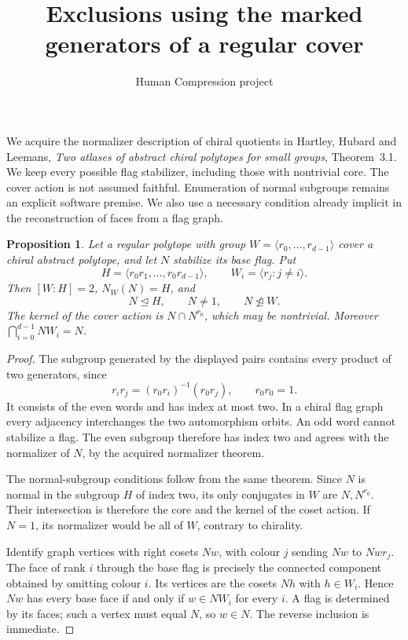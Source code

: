 \documentclass[11pt]{article}
\title{Exclusions using the marked generators of a regular cover}
\author{Human Compression project}\date{}
\newtheorem{proposition}{Proposition}
\begin{document}
\maketitle
We acquire the normalizer description of chiral quotients in Hartley,
Hubard and Leemans, \emph{Two atlases of abstract chiral polytopes for
small groups}, Theorem~3.1. We keep every possible flag stabilizer,
including those with nontrivial core. The cover action is not assumed
faithful. Enumeration of normal subgroups remains an explicit software
premise. We also use a necessary condition already implicit in the
reconstruction of faces from a flag graph.

\begin{proposition}
Let a regular polytope with group $W=\langle r_0,\ldots,r_{d-1}\rangle$
cover a chiral abstract polytope, and let $N$ stabilize its base flag. Put
\[
 H=\langle r_0r_1,\ldots,r_0r_{d-1}\rangle,
 \qquad W_i=\langle r_j:j\ne i\rangle.
\]
Then $[W:H]=2$, $N_W(N)=H$, and
\[
 N\trianglelefteq H,\qquad N\ne1,\qquad N\not\trianglelefteq W.
\]
The kernel of the cover action is $N\cap N^{r_0}$, which may be
nontrivial. Moreover $\bigcap_{i=0}^{d-1}NW_i=N$.
\end{proposition}
\begin{proof}
The subgroup generated by the displayed pairs contains every product
of two generators, since
\[
 r_ir_j=(r_0r_i)^{-1}(r_0r_j),\qquad r_0r_0=1.
\]
It consists of the
even words and has index at most two. In a chiral flag graph every
adjacency interchanges the two automorphism orbits. An odd word cannot
stabilize a flag. The even subgroup therefore has index two and agrees
with the normalizer of $N$, by the acquired normalizer theorem.

The normal-subgroup conditions follow from the same theorem. Since
$N$ is normal in the subgroup $H$ of index two, its only conjugates in
$W$ are $N,N^{r_0}$. Their intersection is therefore the core and the
kernel of the coset action. If $N=1$, its normalizer would be all of $W$,
contrary to chirality.

Identify graph vertices with right cosets $Nw$, with colour $j$ sending
$Nw$ to $Nwr_j$. The face of rank $i$ through the base flag is precisely
the connected component obtained by omitting colour $i$. Its vertices
are the cosets $Nh$ with $h\in W_i$. Hence $Nw$ has every base face if
and only if $w\in NW_i$ for every $i$. A flag is determined by its faces;
such a vertex must equal $N$, so $w\in N$. The reverse inclusion is
immediate.
\end{proof}
\end{document}
